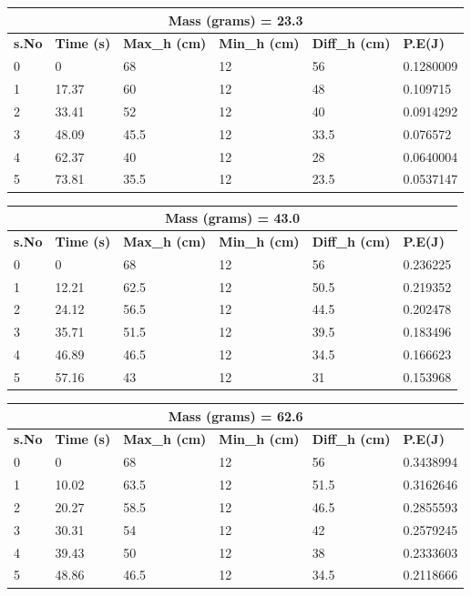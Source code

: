 \begin{center}
\begin{tabular}{|l|l|l|l|l|l|}
\hline
\multicolumn{6}{|c|}{\textbf{Mass (grams) = 23.3}} \\ \hline
\textbf{s.No} & \textbf{Time (s)} & \textbf{Max\_h (cm)} & \textbf{Min\_h (cm)} & \textbf{Diff\_h (cm)} & \textbf{P.E(J)} \\ \hline
0   & 0       & 68     & 12   & 56    & 0.1280009  \\ \hline
1   & 17.37   & 60     & 12   & 48    & 0.109715   \\ \hline
2   & 33.41   & 52     & 12   & 40    & 0.0914292  \\ \hline
3   & 48.09   & 45.5   & 12   & 33.5  & 0.076572   \\ \hline
4   & 62.37   & 40     & 12   & 28    & 0.0640004  \\ \hline
5   & 73.81   & 35.5   & 12   & 23.5  & 0.0537147  \\ \hline
\end{tabular}
\end{center}
\begin{center}
\begin{tabular}{|l|l|l|l|l|l|}
\hline
\multicolumn{6}{|c|}{\textbf{Mass (grams) = 43.0}} \\ \hline
\textbf{s.No} & \textbf{Time (s)} & \textbf{Max\_h (cm)} & \textbf{Min\_h (cm)} & \textbf{Diff\_h (cm)} & \textbf{P.E(J)} \\ \hline
0   & 0       & 68     & 12   & 56     & 0.236225  \\ \hline
1   & 12.21   & 62.5   & 12   & 50.5   & 0.219352  \\ \hline
2   & 24.12   & 56.5   & 12   & 44.5   & 0.202478  \\ \hline
3   & 35.71   & 51.5   & 12   & 39.5   & 0.183496  \\ \hline
4   & 46.89   & 46.5   & 12   & 34.5   & 0.166623  \\ \hline
5   & 57.16   & 43     & 12   & 31     & 0.153968  \\ \hline
\end{tabular}
\end{center}
\begin{center}
\begin{tabular}{|l|l|l|l|l|l|}
\hline
\multicolumn{6}{|c|}{\textbf{Mass (grams) = 62.6}} \\ \hline
\textbf{s.No} & \textbf{Time (s)} & \textbf{Max\_h (cm)} & \textbf{Min\_h (cm)} & \textbf{Diff\_h (cm)} & \textbf{P.E(J)} \\ \hline
0   & 0       & 68     & 12   & 56    & 0.3438994  \\ \hline
1   & 10.02   & 63.5   & 12   & 51.5  & 0.3162646  \\ \hline
2   & 20.27   & 58.5   & 12   & 46.5  & 0.2855593  \\ \hline
3   & 30.31   & 54     & 12   & 42    & 0.2579245  \\ \hline
4   & 39.43   & 50     & 12   & 38    & 0.2333603  \\ \hline
5   & 48.86   & 46.5   & 12   & 34.5  & 0.2118666  \\ \hline
\end{tabular}
\end{center}

